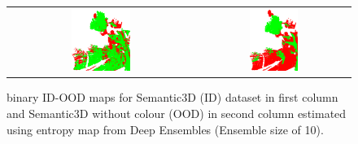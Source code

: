 \begin{figure}[h!]
\begin{tabular}{cc}
            \includegraphics[width=0.33\textwidth, height=0.18\textheight]{images/ood_imgs/sem3d_of/ent/de_sem3d_OOD_3.pdf}&
            \includegraphics[width=0.33\textwidth, height=0.18\textheight]{images/ood_imgs/sem3d_of/ent/de_sem3d_of_OOD_3.pdf}\\
        \end{tabular}
        \caption{binary ID-OOD maps for Semantic3D (ID) dataset in first column and Semantic3D without colour (OOD) in second column estimated using entropy map from Deep Ensembles (Ensemble size of 10).}
        \label{fig:de_oodmap_sem3d_OF_ent}
    \end{figure}


